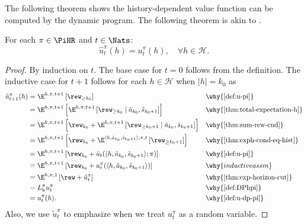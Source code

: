 The following theorem shows the history-dependent value function can be computed by the dynamic program. The following theorem is akin to \citep[theorem~4.2.1]{Puterman2005}.
\begin{theorem} \label{thm:dph-correct-vf}
For each $\pi\in \PiHR$ and $t\in \Nats$:
  \[
    \hat{u}^{\pi}_t(h)
    =
    u^{\pi}_t(h), \quad \forall h\in \mathcal{H}.
  \]
\end{theorem}
\begin{proof}
By induction on $t$. The base case for $t=0$ follows from the definition. The inductive case for $t + 1$ follows for each $h\in \mathcal{H}$ when $|h| = k_0$ as
{\allowdisplaybreaks
\begin{align*}
\hat{u}_{t+1}^{\pi}(h)
&= \E^{h, \pi, t+1} \left[ \rew_{\ge k_0}  \right] && \why{\cref{def:u-pi}}\\
&= \E^{h, \pi, t+1} \left[  \E^{h, \pi, t+1} \left[ \rew_{\ge k_0} \mid \tilde{a}_{k_0}, \tilde{s}_{k_0+1} \right] \right]  && \why{\cref{thm:total-expectation-h}} \\
&= \E^{h, \pi, t+1} \left[\rew_{k_0} +  \E^{h, \pi, t+1} \left[  \rew_{\ge k_0+1} \mid \tilde{a}_{k_0}, \tilde{s}_{k_0+1} \right] \right] && \why{\cref{thm:sum-rew-cnd}} \\
&= \E^{h, \pi, t+1} \left[\rew_{k_0} +  \E^{\langle h,\tilde{a}_{k_0},\tilde{s}_{k_0+1}\rangle, \pi, t} \left[ \rew_{\ge k_0+1} \right]\right] && \why{\cref{thm:exph-cond-eq-hist}} \\
&= \E^{h, \pi, t+1} \left[\rew_{k_0} +  \hat{u}_t(\langle h,\tilde{a}_{k_0},\tilde{s}_{k_0+1}\rangle; \pi) \right] && \why{\cref{def:u-pi}} \\
&= \E^{h, \pi, t+1} \left[\rew_{k_0} +  u^{\pi}_t(\langle h,\tilde{a}_{k_0},\tilde{s}_{k_0+1}\rangle) \right] && \why{inductive assm} \\
&= \E^{h, \pi, 1} \left[\rew +  \tilde{u}^{\pi}_t \right] && \why{\cref{thm:exp-horizon-cut}} \\
&= L_{\mathrm{h}}^{\pi} u_t^{\pi} && \why{\cref{def:DPhpi}} \\
&= u^{\pi}_t(h). && \why{\cref{def:u-dp-pi}}
\end{align*}
}
Also, we use $\tilde{u}_t^{\pi}$ to emphasize when we treat $u^{\pi}_t$ as a random variable. 
\end{proof}

